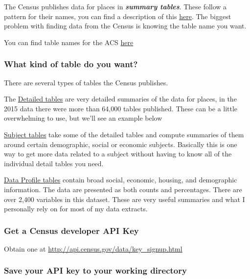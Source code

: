 \documentclass[]{article}
\begin{document}
The Census publishes data for places in \textbf{\emph{summary tables}}.
These follow a pattern for their names, you can find a description of
this
\href{https://www.census.gov/programs-surveys/acs/guidance/which-data-tool/table-ids-explained.html}{here}.
The biggest problem with finding data from the Census is knowing the
table name you want.

You can find table names for the ACS
\href{https://www.census.gov/data/developers/data-sets/acs-5year.html}{here}

\subsubsection{What kind of table do you
want?}\label{what-kind-of-table-do-you-want}

There are several types of tables the Census publishes.

The
\href{https://api.census.gov/data/2016/acs/acs5/variables.html}{Detailed
tables} are very detailed summaries of the data for places, in the 2015
data there were more than 64,000 tables published. These can be a little
overwhelming to use, but we'll see an example below

\href{https://api.census.gov/data/2016/acs/acs5/subject.html}{Subject
tables} take some of the detailed tables and compute summaries of them
around certain demographic, social or economic subjects. Basically this
is one way to get more data related to a subject without having to know
all of the individual detail tables you need.

\href{https://api.census.gov/data/2016/acs/acs5/profile.html}{Data
Profile tables} contain broad social, economic, housing, and demographic
information. The data are presented as both counts and percentages.
There are over 2,400 variables in this dataset. These are very useful
summaries and what I personally rely on for most of my data extracts.

\subsubsection{Get a Census developer API
Key}\label{get-a-census-developer-api-key}

Obtain one at \url{http://api.census.gov/data/key_signup.html}

\subsubsection{Save your API key to your working
directory}\label{save-your-api-key-to-your-working-directory}
\end{document}
